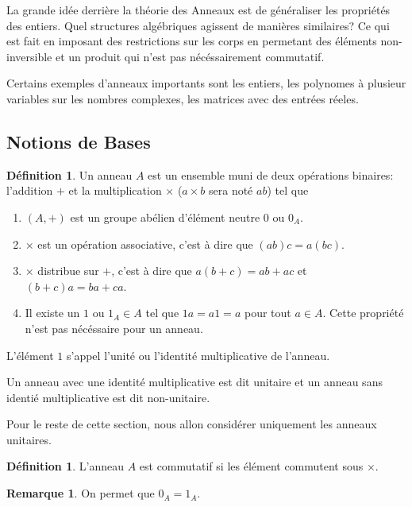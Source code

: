 \documentclass{book}
\theoremstyle{plain}
\theoremstyle{definition}
\newtheorem{defn}[thm]{Définition} %
\newtheorem{rmrk}[thm]{Remarque}
\begin{document}
La grande idée derrière la théorie des Anneaux est de généraliser les propriétés des entiers. Quel structures algébriques agissent de manières similaires? Ce qui est fait en imposant des restrictions sur les corps en permetant des éléments non-inversible et un produit qui n'est pas nécéssairement commutatif.

Certains exemples d'anneaux importants sont les entiers, les polynomes à plusieur variables sur les nombres complexes, les matrices avec des entrées réeles.

\subsection{Notions de Bases}
\begin{defn}
\label{def:ring}
Un anneau $A$ est un ensemble muni de deux opérations binaires: l'addition $+$ et la multiplication $\times$ ($a\times b$ sera noté $ab$) tel que
\begin{enumerate}
\item $(A,+)$ est un groupe abélien d'élément neutre $0$ ou $0_A$.
\item $\times$ est un opération associative, c'est à dire que $(ab)c=a(bc)$.
\item $\times$ distribue sur $+$, c'est à dire que $a(b+c)=ab+ac$ et $(b+c)a=ba+ca$.
\item Il existe un $1$ ou $1_A\in A$ tel que $1a=a1=a$ pour tout  $a\in A$. Cette propriété n'est pas nécéssaire pour un anneau.
\end{enumerate}

L'élément $1$ s'appel l'unité ou l'identité multiplicative de l'anneau.

Un anneau avec une identité multiplicative est dit unitaire et un anneau sans identié multiplicative est dit non-unitaire.

Pour le reste de cette section, nous allon considérer uniquement les anneaux unitaires.
\end{defn}

\begin{defn}
\label{def:ring-comut}
L'anneau $A$ est commutatif si les élément commutent sous $\times$. 
\end{defn}

\begin{rmrk}
On permet que $0_A=1_A$.
\end{rmrk}
\end{document}
